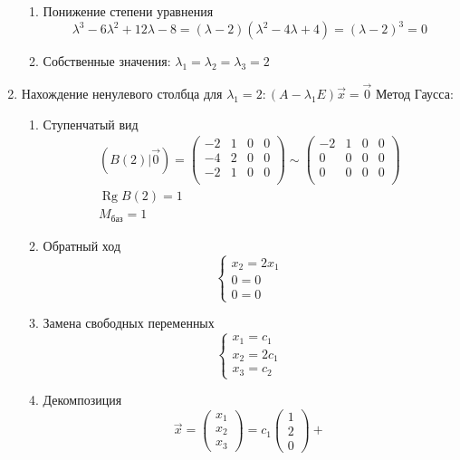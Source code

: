 \documentclass{article}
\DeclareMathOperator*{\Rg}{Rg}
\begin{document}
\begin{enumerate}
\begin{enumerate}
		\item Понижение степени уравнения
		\[
			\lambda^3 - 6\lambda^2 + 12\lambda - 8 = (\lambda - 2)(\lambda^2 - 4\lambda + 4) = (\lambda - 2)^3 = 0
		\]
		\item Собственные значения: $\lambda_1 = \lambda_2 = \lambda_3 = 2$
	\end{enumerate}
	\item Нахождение ненулевого столбца для $\lambda_1 = 2 : (A - \lambda_1 E)\vec{x} = \vec{0}$
	Метод Гаусса: \begin{enumerate}
		\item Ступенчатый вид
		\begin{gather*}
			(B(2) | \vec{0}) = \begin{pmatrix}
				-2 & 1 & 0 & 0 \\
				-4 & 2 & 0 & 0 \\
				-2 & 1 & 0 & 0 \\
			\end{pmatrix} \sim \begin{pmatrix}
				-2 & 1 & 0 & 0 \\
				0 & 0 & 0 & 0 \\
				0 & 0 & 0 & 0 \\
			\end{pmatrix} \\
			\Rg B(2) = 1 \\
			M_{\text{баз}} = 1
		\end{gather*}
		\item Обратный ход
		\[
			\begin{cases}
				x_2 = 2x_1 \\
				0 = 0 \\
				0 = 0
			\end{cases}
		\]
		\item Замена свободных переменных
		\[	
			\begin{cases}
				x_1 = c_1 \\
				x_2 = 2c_1 \\
				x_3 = c_2
			\end{cases}
		\]
		\item Декомпозиция
		\[
			\vec{x} = \begin{pmatrix} x_1 \\ x_2 \\ x_3 \end{pmatrix} =
			c_1 \begin{pmatrix} 1 \\ 2 \\ 0 \end{pmatrix} +
\]
\end{enumerate}
\end{enumerate}
\end{document}
